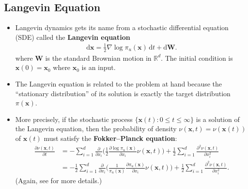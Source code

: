 \documentclass[10pt]{article}
\newcommand{\dee}{\mathrm{d}}
\newcommand{\ve}[1]{\mathbf{#1}}
\newcommand{\Real}{\mathbb{R}}
\begin{document}
\subsection{Langevin Equation}

\begin{itemize}
  \item Langevin dynamics gets its name from a stochastic differential equation (SDE) called the {\bf Langevin equation}
  \begin{align*}
    \dee \ve{x} = \frac{1}{2}\nabla \log \pi_u(\ve{x})\, \dee t + \dee \ve{W}.
  \end{align*}
  where $\ve{W}$ is the standard Brownian motion in $\Real^d$. The initial condition is $\ve{x}(0) = \ve{x}_0$ where $\ve{x}_0$ is an input.

  \item The Langevin equation is related to the problem at hand because the ``stationary distribution'' of its solution is exactly the target distribution $\pi(\ve{x})$. 
  
  \item More precisely, if the stochastic process $\{ \ve{x}(t): 0 \leq t \leq \infty \}$ is a solution of the Langevin equation, then the probability of density $\nu(\ve{x},t) = \nu(\ve{x}(t))$ of $\ve{x}(t)$ must satisfy the {\bf Fokker--Planck equation}:
  \begin{align*}
    \frac{\partial \nu(\ve{x},t)}{\partial t}
    &= - \sum_{i=1}^d \frac{\partial}{\partial x_i} \bigg( \frac{1}{2} \frac{\partial \log \pi_u(\ve{x})}{\partial x_i} \nu(\ve{x},t) \bigg) + \frac{1}{2} \sum_{i=1}^d \frac{\partial^2 \nu(\ve{x},t)}{\partial x_i^2} \\
    &= - \frac{1}{2} \sum_{i=1}^d \frac{\partial}{\partial x_i} \bigg( \frac{1}{\pi_u(\ve{x})} \frac{\partial \pi_u(\ve{x})}{\partial x_i} \nu(\ve{x},t) \bigg) + \frac{1}{2} \sum_{i=1}^d \frac{\partial^2 \nu(\ve{x},t)}{\partial x_i^2}.
  \end{align*}
  (Again, see \cite{Khungurn:2022b} for more details.)


\end{itemize}
\end{document}
